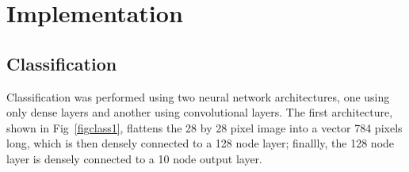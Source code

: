 \documentclass[conference]{IEEEtran}
\begin{document}
    \section{Implementation}\label{sec:implementation}

    \subsection{Classification}\label{subsec:implementation-classification}

    Classification was performed using two neural network architectures, one using only dense layers and another using convolutional layers. The first architecture, shown in Fig~\ref{figclass1}, flattens the 28 by 28 pixel image into a vector 784 pixels long, which is then densely connected to a 128 node layer; finallly, the 128 node layer is densely connected to a 10 node output layer.
\end{document}
